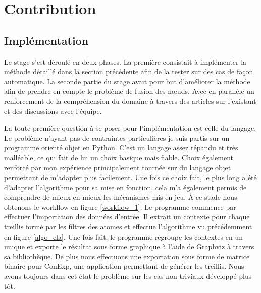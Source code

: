 \chapter{Contribution}

\section{Implémentation}

Le stage s'est déroulé en deux phases. La première consistait à implémenter la méthode détaillé dans la section précédente afin de la tester sur des cas de façon automatique. La seconde partie du stage avait pour but d'améliorer la méthode afin de prendre en compte le problème de fusion des n\oe uds. Avec en parallèle un renforcement de la compréhension du domaine à travers des articles sur l'existant et des discussions avec l'équipe.

\bigbreak

La toute première question à se poser pour l'implémentation est celle du langage. Le problème n'ayant pas de contraintes particulières je suis partis sur un programme orienté objet en Python. C'est un langage assez répandu et très malléable, ce qui fait de lui un choix basique mais fiable. Choix également renforcé par mon expérience principalement tournée sur du langage objet permettant de m'adapter plus facilement. Une fois ce choix fait, le plus long a été d'adapter l'algorithme pour sa mise en fonction, cela m'a également permis de comprendre de mieux en mieux les mécanismes mis en jeu. À ce stade nous obtenons le workflow en figure \ref{workflow_1}. Le programme commence par effectuer l'importation des données d'entrée. Il extrait un contexte pour chaque treillis formé par les filtres des atomes et effectue l'algorithme vu précédemment en figure \ref{algo_cla}. Une fois fait, le programme regroupe les contextes en un unique et exporte le résultat sous forme graphique à l'aide de Graphviz\cite{doc_graphviz} à travers sa bibliothèque\cite{doc_python_graphviz}. De plus nous effectuons une exportation sous forme de matrice binaire pour ConExp\cite{conexp}, une application permettant de générer les treillis. Nous avons toujours dans cet état le problème sur les cas non triviaux développé plus tôt.

